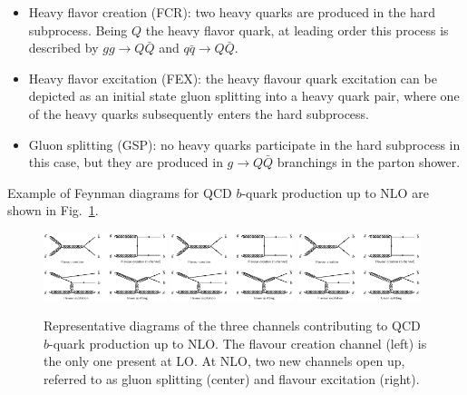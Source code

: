 \begin{itemize}\addtolength{\itemsep}{-0.4\baselineskip}
\item
Heavy flavor creation (FCR): two heavy quarks are produced in the hard subprocess. Being $Q$ the heavy flavor quark, at leading order this process is described by $gg \rightarrow Q\bar{Q}$ and  $q\bar{q} \rightarrow Q\bar{Q}$.
\item
Heavy flavor excitation (FEX): the heavy flavour quark excitation can be depicted as an initial state gluon splitting into a heavy quark pair, where one of the heavy quarks subsequently enters the hard subprocess.
\item
Gluon splitting (GSP): no heavy quarks participate in the hard subprocess in this case, but they are produced in $g \rightarrow Q\bar{Q}$ branchings in the parton shower.
\end{itemize}

Example of Feynman diagrams for QCD $b$-quark production up to NLO are shown in Fig.~\ref{fig:qcd_diagrams}.

%
\begin{figure}[h!]
\centering
\includegraphics[width=0.32\textwidth,viewport=0 880 1500 1600,clip]{FIGS/bb_diagrams.jpg}
\includegraphics[width=0.32\textwidth,viewport=1600 0 3100 820,clip]{FIGS/bb_diagrams.jpg}
\includegraphics[width=0.32\textwidth,viewport=0 0 1500 820,clip]{FIGS/bb_diagrams.jpg}
\caption{Representative diagrams of the three channels contributing to QCD $b$-quark production up to NLO. The flavour creation channel (left) is the only one present at LO. At NLO, two new channels open up, referred to as gluon splitting (center) and  flavour excitation (right).}
\label{fig:qcd_diagrams}
\end{figure}
%

